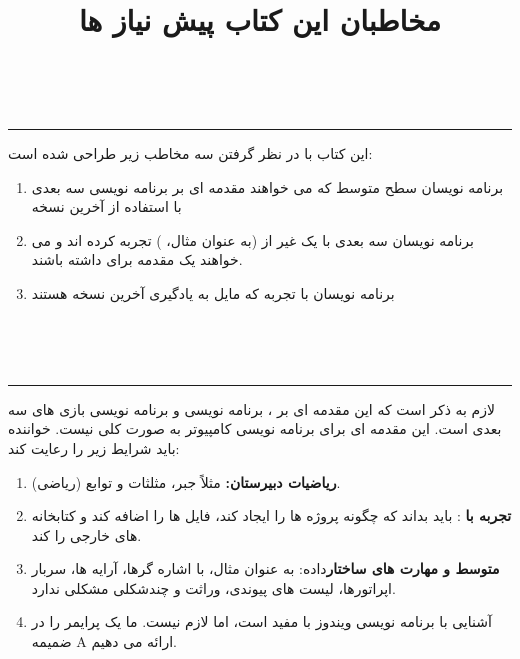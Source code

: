     \newpage

    \title{
        \LARGE
        \textbf{مخاطبان این کتاب}
    }
    \\ \rule{\textwidth}{0.5pt}
    {\large
    این کتاب با در نظر گرفتن سه مخاطب زیر طراحی شده است:
        \begin{enumerate}
            \item {برنامه نویسان سطح متوسط  که می خواهند مقدمه ای بر برنامه نویسی سه بعدی با استفاده از آخرین نسخه }
            \item {برنامه نویسان سه بعدی با یک  غیر از  (به عنوان مثال، ) تجربه کرده اند و می خواهند یک مقدمه برای  داشته باشند.}
            \item {برنامه نویسان با تجربه  که مایل به یادگیری آخرین نسخه  هستند}
        \end{enumerate} \\[50pt]
    }

    \title{
        \LARGE
        \textbf{پیش نیاز ها}
    }
    \\ \rule{\textwidth}{0.5pt}
    {\large
    لازم به ذکر است که این مقدمه ای بر ، برنامه نویسی  و برنامه نویسی بازی های سه بعدی است. این مقدمه ای برای برنامه نویسی کامپیوتر به صورت کلی نیست. خواننده باید شرایط زیر را رعایت کند:
        \begin{enumerate}
            \item {\textbf{ریاضیات دبیرستان: } مثلاً جبر، مثلثات و توابع (ریاضی).}
            \item {\textbf{تجربه با }: باید بداند که چگونه پروژه ها را ایجاد کند، فایل ها را اضافه کند و کتابخانه های خارجی را  کند.}
            \item {\textbf{ متوسط و مهارت های ساختار}داده: به عنوان مثال، با اشاره گرها، آرایه ها، سربار اپراتورها، لیست های پیوندی، وراثت و چندشکلی مشکلی ندارد.}
            \item {آشنایی با برنامه نویسی ویندوز با  مفید است، اما لازم نیست. ما یک پرایمر  را در ضمیمه A ارائه می دهیم.}
        \end{enumerate} \\[50pt]
    }

